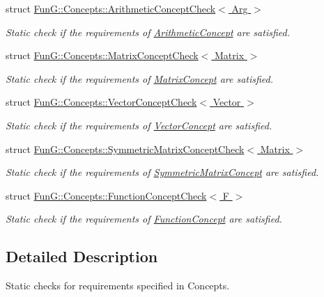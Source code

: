 \begin{DoxyCompactItemize}
struct \hyperlink{structFunG_1_1Concepts_1_1ArithmeticConceptCheck}{Fun\-G\-::\-Concepts\-::\-Arithmetic\-Concept\-Check$<$ Arg $>$}
\begin{DoxyCompactList}\small\item\em Static check if the requirements of \hyperlink{structFunG_1_1Concepts_1_1ArithmeticConcept}{Arithmetic\-Concept} are satisfied. \end{DoxyCompactList}\item 
struct \hyperlink{structFunG_1_1Concepts_1_1MatrixConceptCheck}{Fun\-G\-::\-Concepts\-::\-Matrix\-Concept\-Check$<$ Matrix $>$}
\begin{DoxyCompactList}\small\item\em Static check if the requirements of \hyperlink{structFunG_1_1Concepts_1_1MatrixConcept}{Matrix\-Concept} are satisfied. \end{DoxyCompactList}\item 
struct \hyperlink{structFunG_1_1Concepts_1_1VectorConceptCheck}{Fun\-G\-::\-Concepts\-::\-Vector\-Concept\-Check$<$ Vector $>$}
\begin{DoxyCompactList}\small\item\em Static check if the requirements of \hyperlink{structFunG_1_1Concepts_1_1VectorConcept}{Vector\-Concept} are satisfied. \end{DoxyCompactList}\item 
struct \hyperlink{structFunG_1_1Concepts_1_1SymmetricMatrixConceptCheck}{Fun\-G\-::\-Concepts\-::\-Symmetric\-Matrix\-Concept\-Check$<$ Matrix $>$}
\begin{DoxyCompactList}\small\item\em Static check if the requirements of \hyperlink{structFunG_1_1Concepts_1_1SymmetricMatrixConcept}{Symmetric\-Matrix\-Concept} are satisfied. \end{DoxyCompactList}\item 
struct \hyperlink{structFunG_1_1Concepts_1_1FunctionConceptCheck}{Fun\-G\-::\-Concepts\-::\-Function\-Concept\-Check$<$ F $>$}
\begin{DoxyCompactList}\small\item\em Static check if the requirements of \hyperlink{structFunG_1_1Concepts_1_1FunctionConcept}{Function\-Concept} are satisfied. \end{DoxyCompactList}\end{DoxyCompactItemize}


\subsection{Detailed Description}
Static checks for requirements specified in Concepts. 